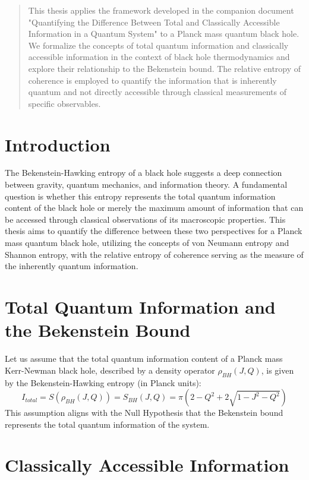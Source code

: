 	
	
	\begin{abstract}
		This thesis applies the framework developed in the companion document "Quantifying the Difference Between Total and Classically Accessible Information in a Quantum System" to a Planck mass quantum black hole. We formalize the concepts of total quantum information and classically accessible information in the context of black hole thermodynamics and explore their relationship to the Bekenstein bound. The relative entropy of coherence is employed to quantify the information that is inherently quantum and not directly accessible through classical measurements of specific observables.
	\end{abstract}
	
	\section{Introduction}
	
	The Bekenstein-Hawking entropy of a black hole suggests a deep connection between gravity, quantum mechanics, and information theory. A fundamental question is whether this entropy represents the total quantum information content of the black hole or merely the maximum amount of information that can be accessed through classical observations of its macroscopic properties. This thesis aims to quantify the difference between these two perspectives for a Planck mass quantum black hole, utilizing the concepts of von Neumann entropy and Shannon entropy, with the relative entropy of coherence serving as the measure of the inherently quantum information.
	
	\section{Total Quantum Information and the Bekenstein Bound}
	
	Let us assume that the total quantum information content of a Planck mass Kerr-Newman black hole, described by a density operator $\rho_{BH}(J, Q)$, is given by the Bekenstein-Hawking entropy (in Planck units):
	$$I_{total} = S(\rho_{BH}(J, Q)) = S_{BH}(J, Q) = \pi (2 - Q^2 + 2 \sqrt{1 - J^2 - Q^2})$$
	This assumption aligns with the Null Hypothesis that the Bekenstein bound represents the total quantum information of the system.
	
	\section{Classically Accessible Information}
	
